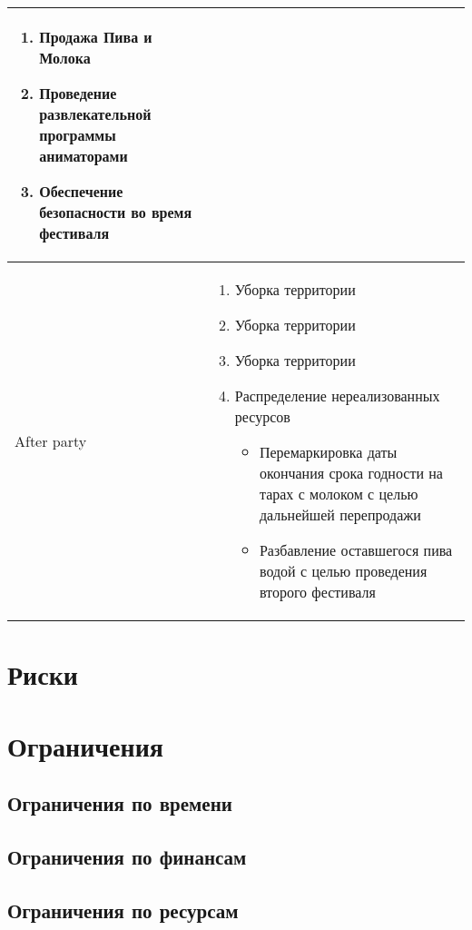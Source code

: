 \documentclass[a4paper,12pt]{article}
\begin{document}
\begin{center}
\begin{longtable}{|p{3cm}|p{11cm}|}
  \begin{enumerate}
    \item Продажа Пива и Молока
    \item Проведение развлекательной программы аниматорами
    \item Обеспечение безопасности во время фестиваля
  \end{enumerate} \\
  \hline
  After party & 
  \begin{enumerate}
    \item Уборка территории
    \item Уборка территории
    \item Уборка территории
    \item Распределение нереализованных ресурсов
      \begin{itemize}
        \item Перемаркировка даты окончания срока годности на тарах с молоком с целью дальнейшей перепродажи
        \item Разбавление оставшегося пива водой с целью проведения второго фестиваля
      \end{itemize}
  \end{enumerate}\\
  \hline
\end{longtable}
\end{center}
\section{Риски}
\section{Ограничения}
\subsection{Ограничения по времени}
\subsection{Ограничения по финансам}
\subsection{Ограничения по ресурсам}
\end{document}
